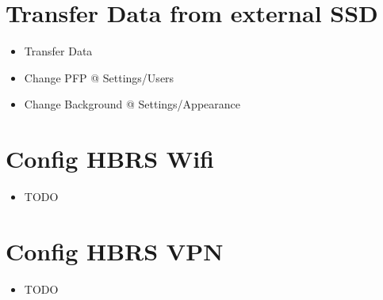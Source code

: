 \documentclass[12pt]{article}
\begin{document}
    \section{Transfer Data from external SSD}\label{sec:transfer-data-from-external-ssd}
    \begin{itemize}
        \item Transfer Data
        \item Change PFP @ Settings/Users
        \item Change Background @ Settings/Appearance
    \end{itemize}


    \section{Config HBRS Wifi}\label{sec:config-hbrs-wifi}
        \begin{itemize}
            \item TODO
        \end{itemize}

    \section{Config HBRS VPN}\label{sec:config-hbrs-vpn}
    \begin{itemize}
        \item TODO
    \end{itemize}
\end{document}
